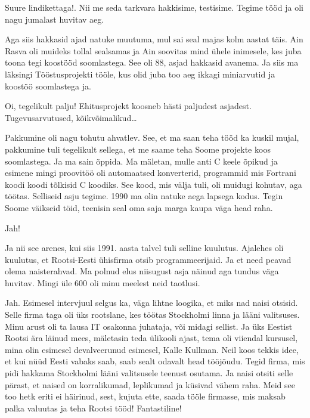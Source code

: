 
Suure lindikettaga!. Nii me seda tarkvara hakkisime, testisime. Tegime tööd ja oli nagu jumalast huvitav aeg.

Aga siis hakkasid ajad natuke muutuma, mul sai seal majas kolm aastat täis. Ain Rasva oli muideks tollal sealsamas ja Ain soovitas mind ühele inimesele, kes juba toona tegi koostööd soomlastega. See oli 88, asjad hakkasid avanema. Ja siis ma läksingi Tööstusprojekti tööle, kus  olid juba too aeg ikkagi miniarvutid ja koostöö soomlastega ja. 


Oi, tegelikult palju! Ehitusprojekt koosneb  hästi paljudest asjadest. Tugevusarvutused, kõikvõimalikud\ldots 


Pakkumine oli nagu tohutu ahvatlev. See, et ma saan teha tööd ka kuskil mujal, pakkumine tuli tegelikult sellega, et me saame teha Soome projekte koos soomlastega. Ja ma sain õppida. Ma mäletan, mulle anti C keele õpikud ja esimene mingi proovitöö oli automaatsed konverterid,  programmid mis  Fortrani koodi koodi tõlkisid C koodiks. See kood, mis välja tuli, oli muidugi kohutav, aga töötas. Selliseid asju tegime. 1990 ma olin natuke aega lapsega kodus. Tegin Soome väikseid töid, teenisin seal oma saja marga kaupa  väga head raha. 


Jah!

Ja nii see arenes, kui siis 1991. aasta talvel tuli selline kuulutus. Ajalehes oli kuulutus, et Rootsi-Eesti ühisfirma otsib programmeerijaid. Ja et need peavad olema naisterahvad. Ma polnud elus niisugust asja näinud aga tundus väga huvitav. Mingi üle 600 oli minu meelest neid taotlusi. 


Jah. Esimesel intervjuul selgus ka, väga lihtne loogika, et miks nad naisi otsisid. Selle firma taga oli üks rootslane, kes töötas Stockholmi linna ja lääni valitsuses. Minu arust oli ta lausa IT osakonna juhataja, või midagi sellist. Ja  üks Eestist Rootsi ära läinud mees, mäletasin teda ülikooli ajast, tema oli viiendal kursusel, mina olin esimesel devalveerunud esimesel, Kalle Kullman. Neil koos tekkis idee, et kui nüüd Eesti vabaks saab, saab sealt odavalt head tööjõudu. Tegid firma, mis pidi hakkama Stockholmi lääni valitsusele teenust osutama. Ja naisi otsiti selle pärast, et naised on korralikumad, leplikumad ja küsivad vähem raha. Meid see too hetk eriti ei häirinud, sest, kujuta ette, saada tööle firmasse, mis maksab palka valuutas ja teha Rootsi tööd! Fantastiline!


